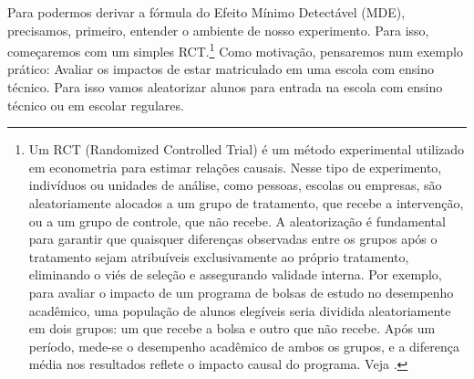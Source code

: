 Para podermos derivar a fórmula do Efeito Mínimo Detectável (MDE), precisamos, primeiro, entender o ambiente de nosso experimento. Para isso, começaremos com um simples RCT.\footnote{Um RCT (Randomized Controlled Trial) é um método experimental utilizado em econometria para estimar relações causais. Nesse tipo de experimento, indivíduos ou unidades de análise, como pessoas, escolas ou empresas, são aleatoriamente alocados a um grupo de tratamento, que recebe a intervenção, ou a um grupo de controle, que não recebe. A aleatorização é fundamental para garantir que quaisquer diferenças observadas entre os grupos após o tratamento sejam atribuíveis exclusivamente ao próprio tratamento, eliminando o viés de seleção e assegurando validade interna. Por exemplo, para avaliar o impacto de um programa de bolsas de estudo no desempenho acadêmico, uma população de alunos elegíveis seria dividida aleatoriamente em dois grupos: um que recebe a bolsa e outro que não recebe. Após um período, mede-se o desempenho acadêmico de ambos os grupos, e a diferença média nos resultados reflete o impacto causal do programa. Veja \cite{duflo2007}.} Como motivação, pensaremos num exemplo prático: Avaliar os impactos de estar matriculado em uma escola com ensino técnico. Para isso vamos aleatorizar alunos para entrada na escola com ensino técnico ou em escolar regulares.



